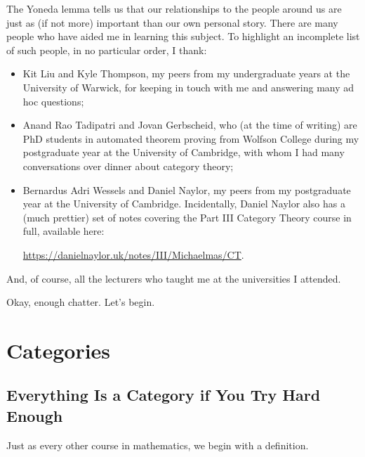 \documentclass[a4paper,11pt]{article}
\theoremstyle{break_italics}
\theoremstyle{break_upright}
\theoremstyle{remark}
\begin{document}
The Yoneda lemma tells us that our relationships to the people around us are just as (if not more) important than our own personal story. There are many people who have aided me in learning this subject. To highlight an incomplete list of such people, in no particular order, I thank:
\begin{itemize}
	\item Kit Liu and Kyle Thompson, my peers from my undergraduate years at the University of Warwick, for keeping in touch with me and answering many ad hoc questions;
	\item Anand Rao Tadipatri and Jovan Gerbscheid, who (at the time of writing) are PhD students in automated theorem proving from Wolfson College during my postgraduate year at the University of Cambridge, with whom I had many conversations over dinner about category theory;
	\item Bernardus Adri Wessels and Daniel Naylor, my peers from my postgraduate year at the University of Cambridge. Incidentally, Daniel Naylor also has a (much prettier) set of notes covering the Part III Category Theory course in full, available here: 
		
		\url{https://danielnaylor.uk/notes/III/Michaelmas/CT}.
\end{itemize}
And, of course, all the lecturers who taught me at the universities I attended.

Okay, enough chatter. Let's begin.






\clearpage \newpage
\section{Categories}

\subsection{Everything Is a Category if You Try Hard Enough}

Just as every other course in mathematics, we begin with a definition.
\end{document}
